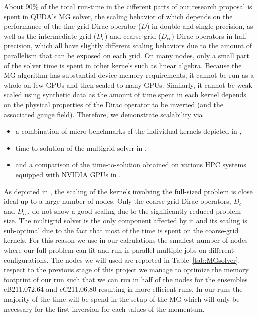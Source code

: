 About 90\% of the total run-time in the different parts of our research proposal is spent in QUDA's MG solver, the scaling behavior of which depends on the performance of the fine-grid Dirac operator ($D$) in double and single precision, as well as the intermediate-grid ($D_c$) and coarse-grid ($D_{cc}$) Dirac operators in half precision, which all have slightly different scaling behaviors due to the amount of parallelism that can be exposed on each grid.
On many nodes, only a small part of the solver time is spent in other kernels such as linear algebra.
Because the MG algorithm has substantial device memory requirements, it cannot be run as a whole on few GPUs and then scaled to many GPUs.
Similarly, it cannot be weak-scaled using synthetic data as the amount of time spent in each kernel depends on the physical properties of the Dirac operator to be inverted (and the associated gauge field).
Therefore, we demonstrate scalability via
\begin{itemize}
	\item  a combination of micro-benchmarks of the individual kernels depicted in ,
	\item time-to-solution of the multigrid solver in ,
	\item and a comparison of the time-to-solution obtained on various HPC systems equipped with NVIDIA GPUs  in .
\end{itemize}
As depicted in , the scaling of the kernels involving the full-sized problem is close ideal up to a large number of nodes.
Only the coarse-grid Dirac operators, $D_c$ and $D_{cc}$, do not show a good scaling due to the significantly reduced problem size.
The multigrid solver is the only component affected by it and its scaling is sub-optimal due to the fact that most of the time is spent on the coarse-grid kernels. For this reason we use in our calculations the smallest number of nodes where our full problem can fit and run in parallel multiple jobs on different configurations.
The nodes we will used are reported in Table~\ref{tab:MGsolver}, respect to the 
previous stage of this project we manage to optimize the memory footprint 
of our run such that we can run in half of the nodes for the ensembles cB211.072.64
and cC211.06.80 resulting in more efficient runs.
In our runs the majority of the time will be spend in the setup of the MG
which will only be necessary for the first inversion for each values of the momentum.

